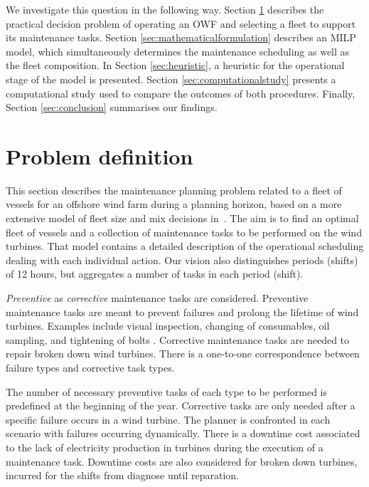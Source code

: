 We investigate this question in the following way. Section \ref{sec:problemdescription} describes the practical decision problem of operating an OWF and selecting a fleet to support its maintenance tasks. Section \ref{sec:mathematicalformulation} describes an MILP model, which simultaneously determines the maintenance scheduling as well as the fleet composition. In Section \ref{sec:heuristic}, a heuristic for the operational stage of the model is presented. Section \ref{sec:computationalstudy} presents a computational study used to compare the outcomes of both procedures. Finally, Section \ref{sec:conclusion} summarises our findings.


\section{Problem definition}
\label{sec:problemdescription}

This section describes the maintenance planning problem related to a fleet of vessels for an offshore wind farm during a planning horizon, based on a more extensive model of fleet size and mix decisions in~\cite{Elin}. The aim is to find an optimal fleet of vessels and a collection of maintenance tasks to be performed on the wind turbines. That model contains a detailed description of the operational scheduling dealing with each individual action. Our vision also distinguishes  periods (shifts) of 12 hours, but aggregates a number of tasks in each period (shift).


\emph{Preventive} as \emph{corrective} maintenance tasks are considered. 
Preventive maintenance tasks are meant to prevent failures and prolong the lifetime of wind turbines. Examples include visual inspection, changing of consumables, oil sampling, and tightening of bolts \cite{obdam}. Corrective maintenance tasks are needed to repair broken down wind turbines. There is a one-to-one correspondence between failure types and corrective task types. 


The number of necessary preventive tasks of each type to be performed is predefined at the beginning of the year. Corrective tasks are only needed after a specific failure occurs in a wind turbine. The planner is confronted in each scenario with failures occurring dynamically. There is a downtime cost associated to the lack of electricity production in turbines during the execution of a maintenance task. Downtime costs are also considered for broken down turbines, incurred for the shifts from diagnose until reparation.




